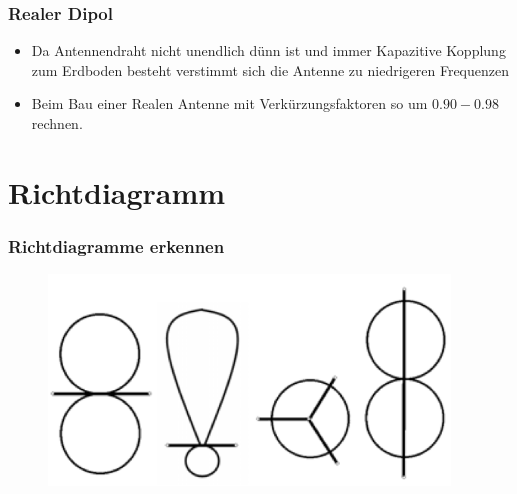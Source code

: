 \begin{frame}
  \frametitle{Realer Dipol}
  \begin{center}
    \begin{itemize}
      \item Da Antennendraht nicht unendlich dünn ist und immer Kapazitive Kopplung zum Erdboden besteht verstimmt sich die Antenne zu niedrigeren Frequenzen
      \item Beim Bau einer Realen Antenne mit Verkürzungsfaktoren so um $0.90-0.98$ rechnen.
    \end{itemize}
  \end{center}
\end{frame}

\section*{Richtdiagramm}

\begin{frame}
  \frametitle{Richtdiagramme erkennen}
  \begin{center}
    \begin{figure}
      \includegraphics[width=0.95\textwidth,height=.75\textheight,keepaspectratio]{a09/Abstrahl.png}
    \end{figure}
  \end{center}
\end{frame}

